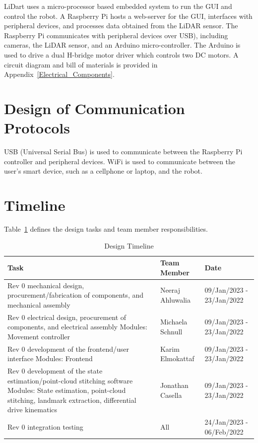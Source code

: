 \documentclass[12pt, titlepage]{article}
\begin{document}
LiDart uses a micro-processor based embedded system to run the GUI and control the robot. A Raspberry Pi hosts a web-server for the GUI, interfaces with peripheral devices, and processes data obtained from the LiDAR sensor. The Raspberry Pi communicates with peripheral devices over USB), including cameras, the LiDAR sensor, and an Arduino micro-controller. The Arduino is used to drive a dual H-bridge motor driver which controls two DC motors. A circuit diagram and bill of materials is provided in Appendix~\ref{Electrical_Components}.

\section{Design of Communication Protocols}
\label{sec_Comm}


USB (Universal Serial Bus) is used to communicate between the Raspberry Pi controller and peripheral devices. WiFi is used to communicate between the user's smart device, such as a cellphone or laptop, and the robot.

\section{Timeline}
\label{sec_Timeline}


Table~\ref{Table:Timeline} defines the design tasks and team member responsibilities. 

\begin{table}[H]
\caption{Design Timeline}
\label{Table:Timeline}
\begin{tabularx}{\textwidth}{|X|p{}|p{}|}
\hline
\textbf{Task}                                    & \textbf{Team Member} & \textbf{Date}             \\ \hline
Rev 0 mechanical design, procurement/fabrication of components, and mechanical assembly & Neeraj Ahluwalia & 09/Jan/2023 - 23/Jan/2022 \\ \hline
Rev 0 electrical design, procurement of components, and electrical assembly   \newline Modules: Movement controller  & Michaela Schnull & 09/Jan/2023 - 23/Jan/2022 \\ \hline
Rev 0 development of the frontend/user interface \newline Modules: Frontend & Karim Elmokattaf     & 09/Jan/2023 - 23/Jan/2022 \\ \hline
Rev 0 development of the state estimation/point-cloud stitching software \newline Modules: State estimation, point-cloud stitching, landmark extraction, differential drive kinematics & Jonathan Casella & 09/Jan/2023 - 23/Jan/2022 \\ \hline
Rev 0 integration testing                        & All                  & 24/Jan/2023 - 06/Feb/2022 \\ \hline
\end{tabularx}
\end{table}
\end{document}
